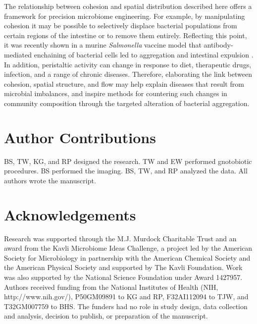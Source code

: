 The relationship between cohesion and spatial distribution described here offers a framework for precision microbiome engineering. For example, by manipulating cohesion it may be possible to selectively displace bacterial populations from certain regions of the intestine or to remove them entirely. Reflecting this point, it was recently shown in a murine \textit{Salmonella} vaccine model that antibody-mediated enchaining of bacterial cells led to aggregation and intestinal expulsion \cite{Moor2017}.  In addition, peristaltic activity can change in response to diet, therapeutic drugs, infection, and a range of chronic diseases. Therefore, elaborating the link between cohesion, spatial structure, and flow may help explain diseases that result from microbial imbalances, and inspire methods for countering such changes in community composition through the targeted alteration of bacterial aggregation. 


\section*{Author Contributions}
BS, TW, KG, and RP designed the research.  TW and EW performed gnotobiotic procedures.  BS performed the imaging.  BS, TW, and RP analyzed the data.  All authors wrote the manuscript.

\section*{Acknowledgements}

Research was supported through the M.J. Murdock Charitable Trust and an award from the Kavli Microbiome Ideas Challenge, a project led by the American Society for Microbiology in partnership with the American Chemical Society and the American Physical Society and supported by The Kavli Foundation. Work was also supported by the National Science Foundation under Award 1427957. Authors received funding from the National Institutes of Health (NIH, http://www.nih.gov/), P50GM09891 to KG and RP, F32AI112094 to TJW, and T32GM007759 to BHS. The funders had no role in study design, data collection and analysis, decision to publish, or preparation of the manuscript.

